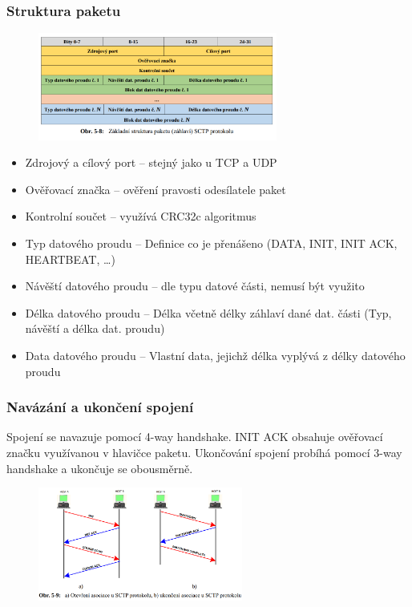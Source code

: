 \subsubsection{Struktura paketu}

\begin{figure}[!h]
    \centering
    \includegraphics[width=0.7\textwidth]{obrazky/033.png}
\end{figure}

\begin{itemize}[noitemsep]
    \item Zdrojový a cílový port -- stejný jako u TCP a UDP
    \item Ověřovací značka -- ověření pravosti odesílatele paket
    \item Kontrolní součet -- využívá CRC32c algoritmus
    \item Typ datového proudu -- Definice co je přenášeno (DATA, INIT, INIT ACK, HEARTBEAT, \dots)
    \item Návěští datového proudu -- dle typu datové části, nemusí být využito
    \item Délka datového proudu -- Délka včetně délky záhlaví dané dat. části (Typ, návěští a délka dat. proudu)
    \item Data datového proudu -- Vlastní data, jejichž délka vyplývá z délky datového proudu
\end{itemize}

\subsubsection{Navázání a ukončení spojení}

Spojení se navazuje pomocí 4-way handshake.
INIT ACK obsahuje ověřovací značku využívanou v hlavičce paketu.
Ukončování spojení probíhá pomocí 3-way handshake a ukončuje se obousměrně.

\begin{figure}[!h]
    \centering
    \includegraphics[width=0.6\textwidth]{obrazky/034.png}
\end{figure}

